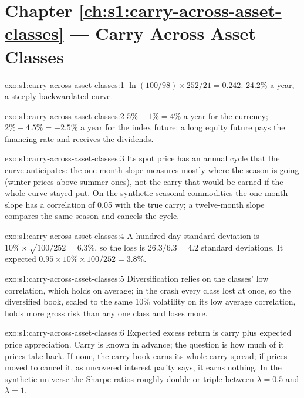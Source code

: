 \section*{Chapter \ref{ch:s1:carry-across-asset-classes} --- Carry Across Asset Classes}

\begin{solution}{exo:s1:carry-across-asset-classes:1}
$\ln(100/98) \times 252/21 = 0.242$: 24.2\% a year, a steeply backwardated curve.
\end{solution}

\begin{solution}{exo:s1:carry-across-asset-classes:2}
$5\% - 1\% = 4\%$ a year for the currency; $2\% - 4.5\% = -2.5\%$ a year for the index future: a long equity future pays the financing rate and
receives the dividends.
\end{solution}

\begin{solution}{exo:s1:carry-across-asset-classes:3}
Its spot price has an annual cycle that the curve anticipates: the one-month slope measures mostly where the season is going (winter prices above
summer ones), not the carry that would be earned if the whole curve stayed put. On the synthetic seasonal commodities the one-month slope has a
correlation of 0.05 with the true carry; a twelve-month slope compares the same season and cancels the cycle.
\end{solution}

\begin{solution}{exo:s1:carry-across-asset-classes:4}
A hundred-day standard deviation is $10\% \times \sqrt{100/252} = 6.3\%$, so the loss is $26.3/6.3 = 4.2$ standard deviations. It expected $0.95 \times
10\% \times 100/252 = 3.8\%$.
\end{solution}

\begin{solution}{exo:s1:carry-across-asset-classes:5}
Diversification relies on the classes' low correlation, which holds on average; in the crash every class lost at once, so the diversified book, scaled
to the same 10\% volatility on its low average correlation, holds more gross risk than any one class and loses more.
\end{solution}

\begin{solution}{exo:s1:carry-across-asset-classes:6}
Expected excess return is carry plus expected price appreciation. Carry is known in advance; the question is how much of it prices take back. If none,
the carry book earns its whole carry spread; if prices moved to cancel it, as uncovered interest parity says, it earns nothing. In the synthetic
universe the Sharpe ratios roughly double or triple between $\lambda = 0.5$ and $\lambda = 1$.
\end{solution}

